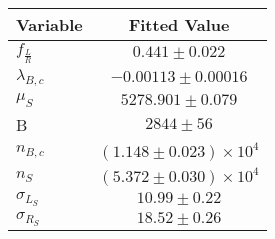 \begin{tabular}[t]{lc}
\hline
Variable &Fitted Value\\
\hline\hline
$f_{\frac{L}{R}}$&$0.441\pm0.022$\\
\hline
$\lambda_{B,c}$&$-0.00113\pm0.00016$\\
\hline
$\mu_S$&$5278.901\pm0.079$\\
\hline
B&$2844\pm56$\\
\hline
$n_{B,c}$&$(1.148\pm0.023)\times 10^4$\\
\hline
$n_S$&$(5.372\pm0.030)\times 10^4$\\
\hline
$\sigma_{L_S}$&$10.99\pm0.22$\\
\hline
$\sigma_{R_S}$&$18.52\pm0.26$\\
\hline
\end{tabular}